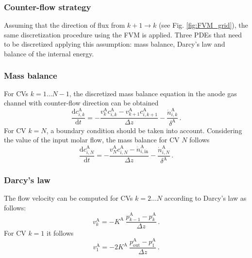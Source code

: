 \documentclass[pdftex,a4paper, 12pt]{article}
\begin{document}
\subsubsection*{Counter-flow strategy}
%
Assuming that the direction of flux from $k+1 \to k$ (see Fig. \ref{fig:FVM_grid}), the same discretization procedure using the FVM is applied. Three PDEs that need to be discretized applying this assumption: mass balance, Darcy's law and balance of the internal energy.
%
\subsubsection*{Mass balance}
%
For CVs $k=1 \dots N-1$, the discretized mass balance equation in the anode gas channel with counter-flow direction can be obtained
%
\begin{equation}
	\frac{\mathrm{d} c_{i,k}^{\mathrm{A}}}{\mathrm{d} t} =-\frac{v_{k}^{\mathrm{A}} c_{i,k}^{\mathrm{A}} - v_{k+1}^{\mathrm{A}} c_{i,k+1}^{\mathrm{A}}}{\Delta z} - \frac{\dot{n}_{i,k}^{\mathrm{A}}}{\delta^{\mathrm{A}}} \, .
	\label{eq:mass_balA_disc_counter}
\end{equation}
%
%
For CV $k = N$, a boundary condition should be taken into account. Considering the value of the input molar flow, the mass balance for CV $N$ follows
%
\begin{equation}
	\frac{\mathrm{d} c_{i,N}^{\mathrm{A}}}{\mathrm{d} t} =-\frac{v_{N}^{\mathrm{A}} c_{i,N}^{\mathrm{A}} - \dot{n}_{i,\mathrm{in}}^{\mathrm{A}} }{\Delta z} - \frac{\dot{n}_{i,N}^{\mathrm{A}}}{\delta^{\mathrm{A}}} \, .
	\label{eq:mass_balA_disc1_counter}
\end{equation}
%
\subsubsection*{Darcy's law}
%
The flow velocity can be computed for CVs $k=2 \dots N$ according to Darcy's law as follows:
%
\begin{equation}
	v_{k}^{\mathrm{A}} = -K^{\mathrm{A}} ~\frac{p_{k-1}^{\mathrm{A}} - p_{k}^{\mathrm{A}}}{\Delta z} \, .
	\label{eq:imp_bal_disc_count}
\end{equation}
%
For CV $k = 1$ it follows
%
\begin{equation}
	v_{1}^{\mathrm{A}} = -2 K^{\mathrm{A}} ~\frac{p^{\mathrm{A}}_{\mathrm{out}} - p_{1}^{\mathrm{A}}}{\Delta z} \, .
	\label{eq:imp_bal_discN_count}
\end{equation}
%
\end{document}
